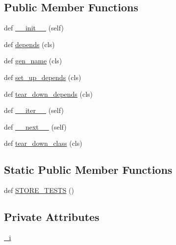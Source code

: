 \subsection*{Public Member Functions}
\begin{DoxyCompactItemize}
\item 
def \hyperlink{classmemoryoracle_1_1test__models_1_1ModelTestData_a18797fe41d3c8464268638787f8c3dc5}{\+\_\+\+\_\+init\+\_\+\+\_\+} (self)
\item 
def \hyperlink{classmemoryoracle_1_1test__models_1_1ModelTestData_afd5752a2650a6d4736537fe668480b82}{depends} (cls)
\item 
def \hyperlink{classmemoryoracle_1_1test__models_1_1ModelTestData_a56f763b4d295036d94fbee70af65cea1}{gen\+\_\+name} (cls)
\item 
def \hyperlink{classmemoryoracle_1_1test__models_1_1ModelTestData_a5fd75de169d65e2c2e8f4cb9ea1d69e2}{set\+\_\+up\+\_\+depends} (cls)
\item 
def \hyperlink{classmemoryoracle_1_1test__models_1_1ModelTestData_a750f789bf83b4e802a5c5e75fe47c074}{tear\+\_\+down\+\_\+depends} (cls)
\item 
def \hyperlink{classmemoryoracle_1_1test__models_1_1ModelTestData_a061762c279897313235cb7656c5733bb}{\+\_\+\+\_\+iter\+\_\+\+\_\+} (self)
\item 
def \hyperlink{classmemoryoracle_1_1test__models_1_1ModelTestData_ae85d49ad6f3a75d68a8f1d6a40f6042c}{\+\_\+\+\_\+next\+\_\+\+\_\+} (self)
\item 
def \hyperlink{classmemoryoracle_1_1test__models_1_1ModelTestData_a91ae773f526de3ba12cb6a95bcb1611f}{tear\+\_\+down\+\_\+class} (cls)
\end{DoxyCompactItemize}
\subsection*{Static Public Member Functions}
\begin{DoxyCompactItemize}
\item 
def \hyperlink{classmemoryoracle_1_1test__models_1_1ModelTestData_a3883fb25e56fa600cac8bb9d66d0629f}{S\+T\+O\+R\+E\+\_\+\+T\+E\+S\+T\+S} ()
\end{DoxyCompactItemize}
\subsection*{Private Attributes}
\begin{DoxyCompactItemize}
\item 
\hyperlink{classmemoryoracle_1_1test__models_1_1ModelTestData_a629e30f2cea7dadc53d5aadc08f35c3c}{\+\_\+i}
\end{DoxyCompactItemize}
